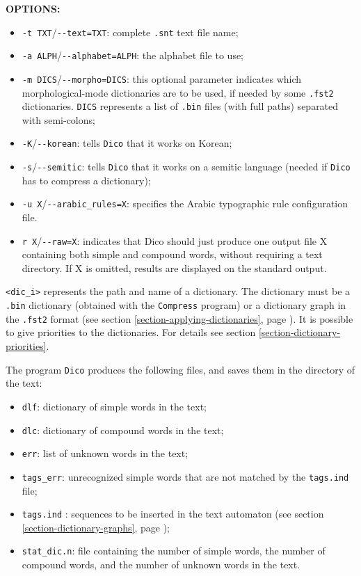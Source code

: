 \bigskip
\noindent \textbf{OPTIONS:}
\begin{itemize}
  \item \verb+-t TXT+/\verb+--text=TXT+: complete \verb+.snt+ text file name;
  \item \verb+-a ALPH+/\verb+--alphabet=ALPH+: the alphabet file to use;
  \item \verb+-m DICS+/\verb+--morpho=DICS+: this optional parameter indicates
  which morphological-mode dictionaries are to be used, if needed by some \verb+.fst2+
  dictionaries. \verb+DICS+ represents a list of \verb+.bin+ files (with full
  paths) separated with semi-colons;
  \item \verb+-K+/\verb+--korean+: tells \verb$Dico$ that it works on Korean;
  \item \verb+-s+/\verb+--semitic+: tells \verb$Dico$ that it works on a semitic language (needed 
  if \verb$Dico$ has to compress a dictionary);
  \item \verb+-u X+/\verb+--arabic_rules=X+: specifies the Arabic typographic rule configuration file.
  \item \verb+r X+/\verb+--raw=X+: indicates that Dico should just produce one
  output file X containing both simple and compound words, without requiring a
  text directory. If X is omitted, results are displayed on the standard output.
\end{itemize}

\bigskip
\noindent
\verb+<dic_i>+ represents the path and name of
a dictionary. The dictionary must be a \verb+.bin+ dictionary (obtained with 
the \verb+Compress+ program) or a dictionary graph in the \verb+.fst2+ format (see section
\ref{section-applying-dictionaries}, page \pageref{section-applying-dictionaries}).
It is possible to give priorities to the dictionaries. For details see 
section \ref{section-dictionary-priorities}.

\bigskip
\noindent The program \verb+Dico+ produces the following files, and saves
them in the directory of the text:

\begin{itemize}
  \item \verb+dlf+: dictionary of simple words in the text;
  \item \verb+dlc+: dictionary of compound words in the text;
  \item \verb+err+: list of unknown words in the text;
  \item \verb+tags_err+: unrecognized simple words that are not matched by the \verb+tags.ind+ file;
  \item \verb+tags.ind+ : sequences to be inserted in the text automaton
  (see section \ref{section-dictionary-graphs}, page \pageref{section-dictionary-graphs});
  \item \verb+stat_dic.n+: file containing the number of simple words, the number
  of compound words, and the number of unknown words in the text.
\end{itemize}

